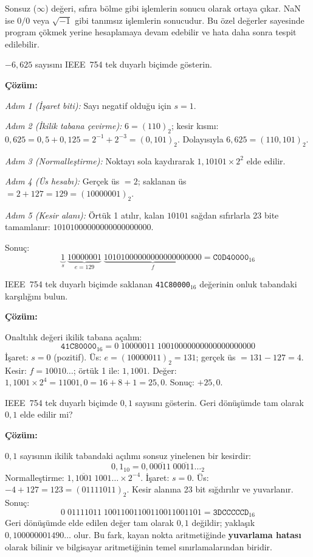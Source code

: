 Sonsuz ($\infty$) değeri, sıfıra bölme gibi işlemlerin sonucu olarak ortaya çıkar. NaN ise $0/0$ veya $\sqrt{-1}$ gibi tanımsız işlemlerin sonucudur. Bu özel değerler sayesinde program çökmek yerine hesaplamaya devam edebilir ve hata daha sonra tespit edilebilir.

\begin{ornek}[A.24]
$-6{,}625$ sayısını IEEE~754 tek duyarlı biçimde gösterin.

\textbf{Çözüm:}

\textit{Adım 1 (İşaret biti):} Sayı negatif olduğu için $s = 1$.

\textit{Adım 2 (İkilik tabana çevirme):} $6 = (110)_2$; kesir kısmı: $0{,}625 = 0{,}5 + 0{,}125 = 2^{-1} + 2^{-3} = (0{,}101)_2$. Dolayısıyla $6{,}625 = (110{,}101)_2$.

\textit{Adım 3 (Normalleştirme):} Noktayı sola kaydırarak $1{,}10101 \times 2^2$ elde edilir.

\textit{Adım 4 (Üs hesabı):} Gerçek üs $= 2$; saklanan üs $= 2 + 127 = 129 = (10000001)_2$.

\textit{Adım 5 (Kesir alanı):} Örtük 1 atılır, kalan $10101$ sağdan sıfırlarla 23 bite tamamlanır: $10101000000000000000000$.

Sonuç:
\[
\underbrace{1}_{s}\;\underbrace{10000001}_{e=129}\;\underbrace{10101000000000000000000}_{f} = \texttt{C0D40000}_{16}
\]
\end{ornek}

\begin{ornek}[A.25]
IEEE~754 tek duyarlı biçimde saklanan \texttt{41C80000}$_{16}$ değerinin onluk tabandaki karşılığını bulun.

\textbf{Çözüm:}

Onaltılık değeri ikilik tabana açalım:
\[
\texttt{41C80000}_{16} = 0\;10000011\;10010000000000000000000
\]
İşaret: $s = 0$ (pozitif). Üs: $e = (10000011)_2 = 131$; gerçek üs $= 131 - 127 = 4$. Kesir: $f = 10010\ldots$; örtük 1 ile: $1{,}1001$. Değer: $1{,}1001 \times 2^4 = 11001{,}0 = 16 + 8 + 1 = 25{,}0$. Sonuç: $+25{,}0$.
\end{ornek}

\begin{ornek}[A.26]
IEEE~754 tek duyarlı biçimde $0{,}1$ sayısını gösterin. Geri dönüşümde tam olarak $0{,}1$ elde edilir mi?

\textbf{Çözüm:}

$0{,}1$ sayısının ikilik tabandaki açılımı sonsuz yinelenen bir kesirdir:
\[
0{,}1_{10} = 0{,}0\overline{0011}\;0\overline{0011}\ldots_2
\]
Normalleştirme: $1{,}\overline{1001}\;1001\ldots \times 2^{-4}$. İşaret: $s = 0$. Üs: $-4 + 127 = 123 = (01111011)_2$. Kesir alanına 23 bit sığdırılır ve yuvarlanır. Sonuç:
\[
0\;01111011\;10011001100110011001101 = \texttt{3DCCCCCD}_{16}
\]
Geri dönüşümde elde edilen değer tam olarak $0{,}1$ değildir; yaklaşık $0{,}100000001490\ldots$ olur. Bu fark, kayan nokta aritmetiğinde \textbf{yuvarlama hatası} olarak bilinir ve bilgisayar aritmetiğinin temel sınırlamalarından biridir.
\end{ornek}



